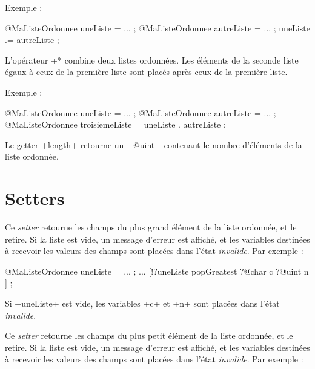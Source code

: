 Exemple :
\begin{galgascode}
@MaListeOrdonnee uneListe = ... ;
@MaListeOrdonnee autreListe = ... ;
uneListe .= autreListe ;
\end{galgascode}


L'opérateur \ggs*+* combine deux listes ordonnées. Les éléments de la seconde liste égaux à ceux de la première liste sont placés après ceux de la première liste.

Exemple :
\begin{galgascode}
@MaListeOrdonnee uneListe = ... ;
@MaListeOrdonnee autreListe = ... ;
@MaListeOrdonnee troisiemeListe = uneListe . autreListe ;
\end{galgascode}








Le getter \ggs+length+ retourne un \ggs+@uint+ contenant le nombre d'éléments de la liste ordonnée.






\section{Setters}


Ce \emph{setter} retourne les champs du plus grand élément de la liste ordonnée, et le retire. Si la liste est vide, un message d'erreur est affiché, et les variables destinées à recevoir les valeurs des champs sont placées dans l'état \emph{invalide}. Par exemple :

\begin{galgascode}
@MaListeOrdonnee uneListe = ... ;
...
[!?uneListe popGreatest
  ?@char c
  ?@uint n
] ;
\end{galgascode}

Si \ggs+uneListe+ est vide, les variables \ggs+c+ et \ggs+n+ sont placées dans l'état \emph{invalide}.



Ce \emph{setter} retourne les champs du plus petit élément de la liste ordonnée, et le retire. Si la liste est vide, un message d'erreur est affiché, et les variables destinées à recevoir les valeurs des champs sont placées dans l'état \emph{invalide}. Par exemple :

